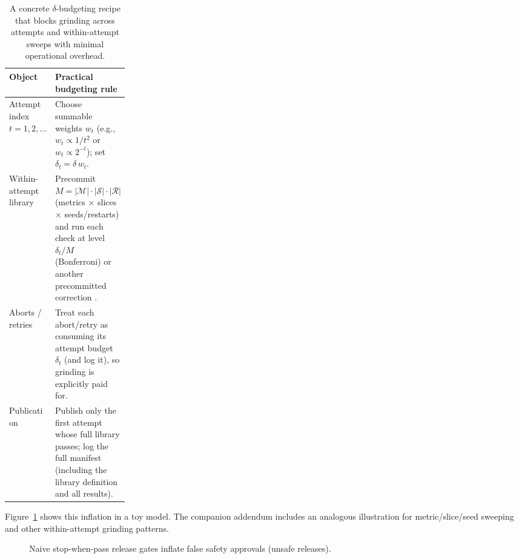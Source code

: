 \documentclass[11pt]{article}
\begin{document}
\begin{table}[t]
\centering
\begin{tabularx}{\linewidth}{@{}L{0.23\linewidth}Y@{}}
\toprule
Object & Practical budgeting rule \\
\midrule
Attempt index $t=1,2,\dots$ & Choose summable weights $w_t$ (e.g., $w_t \propto 1/t^2$ or $w_t \propto 2^{-t}$); set $\delta_t=\delta\, w_t$.\\
Within-attempt library & Precommit $M = |\mathcal{M}|\cdot|\mathcal{S}|\cdot|\mathcal{R}|$ (metrics $\times$ slices $\times$ seeds/restarts) and run each check at level $\delta_t/M$ (Bonferroni) or another precommitted correction \cite{series:manytestinglowerbounds}.\\
Aborts / retries & Treat each abort/retry as consuming its attempt budget $\delta_t$ (and log it), so grinding is explicitly paid for.\\
Publication & Publish only the first attempt whose full library passes; log the full manifest (including the library definition and all results).\\
\bottomrule
\end{tabularx}
\caption{A concrete $\delta$-budgeting recipe that blocks grinding across attempts and within-attempt sweeps with minimal operational overhead.}
\label{tab:budget_recipe}
\end{table}

Figure~\ref{fig:stop_when_pass} shows this inflation in a toy model.
The companion addendum includes an analogous illustration for metric/slice/seed sweeping and other within-attempt grinding patterns. \cite{series:evalnotaryaddendum}


\begin{figure}[t]
\centering
{}
\caption{Naive stop-when-pass release gates inflate false safety approvals (unsafe releases).}
\label{fig:stop_when_pass}
\end{figure}


\end{document}
